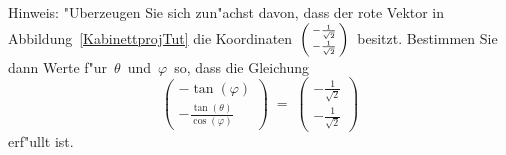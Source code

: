 \begin{Aufgabe}
\begin{Teilaufgaben}
  Hinweis: "Uberzeugen Sie sich zun"achst davon, dass der rote Vektor in Abbildung~\ref{KabinettprojTut} die Koordinaten\, $\begin{psmallmatrix} - \frac{1}{\sqrt{2}}\\ - \frac{1}{\sqrt{2}} \end{psmallmatrix}$\, besitzt. Bestimmen Sie dann Werte f"ur\, $\theta$\, und\, $\varphi$\, so, dass die Gleichung \[\begin{pmatrix} - \tan(\varphi) \\ - \frac{\tan(\theta)}{\cos(\varphi)} \end{pmatrix}\;=\;\begin{pmatrix} - \frac{1}{\sqrt{2}}\\ - \frac{1}{\sqrt{2}} \end{pmatrix}\] erf"ullt ist.
\end{Teilaufgaben}
\end{Aufgabe}
%